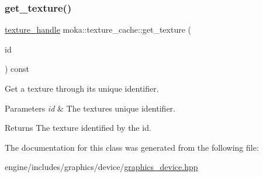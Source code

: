 \subsubsection{\texorpdfstring{get\_texture()}{get\_texture()}}
{\footnotesize\ttfamily \mbox{\hyperlink{structmoka_1_1texture__handle}{texture\+\_\+handle}} moka\+::texture\+\_\+cache\+::get\+\_\+texture (\begin{DoxyParamCaption}\item[{const \mbox{\hyperlink{namespacemoka_a562063640e8ad24ef94c1be0fd9079cf}{texture\+\_\+id}} \&}]{id }\end{DoxyParamCaption}) const}



Get a texture through its unique identifier. 


\begin{DoxyParams}{Parameters}
{\em id} & The texture\textquotesingle{}s unique identifier. \\
\hline
\end{DoxyParams}
\begin{DoxyReturn}{Returns}
The texture identified by the id. 
\end{DoxyReturn}


The documentation for this class was generated from the following file\+:\begin{DoxyCompactItemize}
\item 
engine/includes/graphics/device/\mbox{\hyperlink{graphics__device_8hpp}{graphics\+\_\+device.\+hpp}}\end{DoxyCompactItemize}
